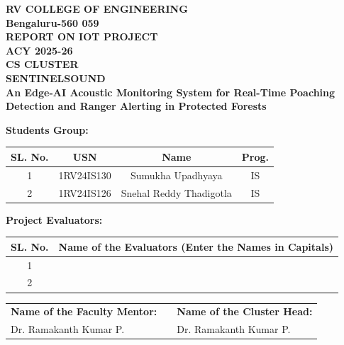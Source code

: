 \documentclass[11pt,a4paper,oneside]{report}
\begin{document}
\begin{titlepage}
    \begin{center}
        \vspace*{0.5cm}
        \Large\textbf{RV COLLEGE OF ENGINEERING} \\
        \large\textbf{Bengaluru-560 059} \\
        \vspace{1.2cm}
        \Large\textbf{REPORT ON IOT PROJECT} \\
        \large\textbf{ACY 2025-26} \\
        \vspace{0.8cm}
        \Large\textbf{CS CLUSTER} \\
        \vspace{1.0cm}
        \Huge\textbf{SENTINELSOUND} \\[0.4cm]
        \large\textbf{An Edge-AI Acoustic Monitoring System for Real-Time Poaching Detection and Ranger Alerting in Protected Forests} \\
        \vspace{1.0cm}
        
        \large\textbf{Students Group:} \\
        \vspace{0.3cm}
        \small
        \begin{tabular}{|c|c|c|c|}
            \hline
            \textbf{SL. No.} & \textbf{USN} & \textbf{Name} & \textbf{Prog.} \\
            \hline
            1 & 1RV24IS130 & Sumukha Upadhyaya & IS \\
            \hline
            2 & 1RV24IS126 & Snehal Reddy Thadigotla & IS \\
            \hline
        \end{tabular}
        
        \vspace{1.2cm}
        \large\textbf{Project Evaluators:} \\
        \vspace{0.3cm}
        \small
        \begin{tabular}{|c|p{8cm}|}
            \hline
            \textbf{SL. No.} & \textbf{Name of the Evaluators (Enter the Names in Capitals)} \\
            \hline
            1 & \\
            \hline
            2 & \\
            \hline
        \end{tabular}
        
        \vspace{1.2cm}
        \small
        \begin{tabular}{p{5.5cm}cp{5.5cm}}
            \textbf{Name of the Faculty Mentor:} & \hfill & \textbf{Name of the Cluster Head:} \\
            Dr. Ramakanth Kumar P. & \hfill & Dr. Ramakanth Kumar P. \\
        \end{tabular}
    \end{center}
\end{titlepage}
\end{document}

